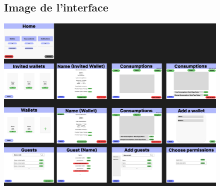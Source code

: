 \newpage
\begin{figure}[h]
\subsection{Image de l'interface}
\centering
\includegraphics[width = 1\textwidth]{Extension-claire/Interface-claire/img/MonInterface.png}
\end{figure}